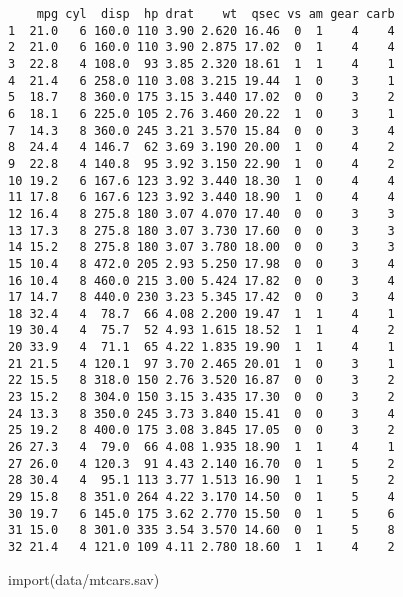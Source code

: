 \documentclass[
  letterpaper,
  DIV=11,
  numbers=noendperiod]{scrreprt}
\newenvironment{Shaded}{\begin{snugshade}}{\end{snugshade}}
\newcommand{\FunctionTok}[1]{\textcolor[rgb]{0.28,0.35,0.67}{#1}}
\newcommand{\NormalTok}[1]{\textcolor[rgb]{0.00,0.23,0.31}{#1}}
\newcommand{\StringTok}[1]{\textcolor[rgb]{0.13,0.47,0.30}{#1}}
\begin{document}
\begin{verbatim}
    mpg cyl  disp  hp drat    wt  qsec vs am gear carb
1  21.0   6 160.0 110 3.90 2.620 16.46  0  1    4    4
2  21.0   6 160.0 110 3.90 2.875 17.02  0  1    4    4
3  22.8   4 108.0  93 3.85 2.320 18.61  1  1    4    1
4  21.4   6 258.0 110 3.08 3.215 19.44  1  0    3    1
5  18.7   8 360.0 175 3.15 3.440 17.02  0  0    3    2
6  18.1   6 225.0 105 2.76 3.460 20.22  1  0    3    1
7  14.3   8 360.0 245 3.21 3.570 15.84  0  0    3    4
8  24.4   4 146.7  62 3.69 3.190 20.00  1  0    4    2
9  22.8   4 140.8  95 3.92 3.150 22.90  1  0    4    2
10 19.2   6 167.6 123 3.92 3.440 18.30  1  0    4    4
11 17.8   6 167.6 123 3.92 3.440 18.90  1  0    4    4
12 16.4   8 275.8 180 3.07 4.070 17.40  0  0    3    3
13 17.3   8 275.8 180 3.07 3.730 17.60  0  0    3    3
14 15.2   8 275.8 180 3.07 3.780 18.00  0  0    3    3
15 10.4   8 472.0 205 2.93 5.250 17.98  0  0    3    4
16 10.4   8 460.0 215 3.00 5.424 17.82  0  0    3    4
17 14.7   8 440.0 230 3.23 5.345 17.42  0  0    3    4
18 32.4   4  78.7  66 4.08 2.200 19.47  1  1    4    1
19 30.4   4  75.7  52 4.93 1.615 18.52  1  1    4    2
20 33.9   4  71.1  65 4.22 1.835 19.90  1  1    4    1
21 21.5   4 120.1  97 3.70 2.465 20.01  1  0    3    1
22 15.5   8 318.0 150 2.76 3.520 16.87  0  0    3    2
23 15.2   8 304.0 150 3.15 3.435 17.30  0  0    3    2
24 13.3   8 350.0 245 3.73 3.840 15.41  0  0    3    4
25 19.2   8 400.0 175 3.08 3.845 17.05  0  0    3    2
26 27.3   4  79.0  66 4.08 1.935 18.90  1  1    4    1
27 26.0   4 120.3  91 4.43 2.140 16.70  0  1    5    2
28 30.4   4  95.1 113 3.77 1.513 16.90  1  1    5    2
29 15.8   8 351.0 264 4.22 3.170 14.50  0  1    5    4
30 19.7   6 145.0 175 3.62 2.770 15.50  0  1    5    6
31 15.0   8 301.0 335 3.54 3.570 14.60  0  1    5    8
32 21.4   4 121.0 109 4.11 2.780 18.60  1  1    4    2
\end{verbatim}

\begin{Shaded}
\begin{Highlighting}[]
\FunctionTok{import}\NormalTok{(}\StringTok{\textquotesingle{}data/mtcars.sav\textquotesingle{}}\NormalTok{)}
\end{Highlighting}
\end{Shaded}
\end{document}
